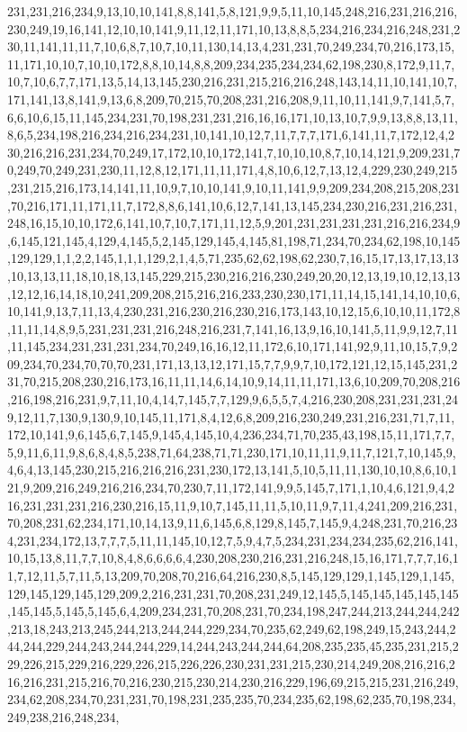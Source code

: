 231,231,216,234,9,13,10,10,141,8,8,141,5,8,121,9,9,5,11,10,145,248,216,231,216,216,230,249,19,16,141,12,10,10,141,9,11,12,11,171,10,13,8,8,5,234,216,234,216,248,231,230,11,141,11,11,7,10,6,8,7,10,7,10,11,130,14,13,4,231,231,70,249,234,70,216,173,15,11,171,10,10,7,10,10,172,8,8,10,14,8,8,209,234,235,234,234,62,198,230,8,172,9,11,7,10,7,10,6,7,7,171,13,5,14,13,145,230,216,231,215,216,216,248,143,14,11,10,141,10,7,171,141,13,8,141,9,13,6,8,209,70,215,70,208,231,216,208,9,11,10,11,141,9,7,141,5,7,6,6,10,6,15,11,145,234,231,70,198,231,231,216,16,16,171,10,13,10,7,9,9,13,8,8,13,11,8,6,5,234,198,216,234,216,234,231,10,141,10,12,7,11,7,7,7,171,6,141,11,7,172,12,4,230,216,216,231,234,70,249,17,172,10,10,172,141,7,10,10,10,8,7,10,14,121,9,209,231,70,249,70,249,231,230,11,12,8,12,171,11,11,171,4,8,10,6,12,7,13,12,4,229,230,249,215,231,215,216,173,14,141,11,10,9,7,10,10,141,9,10,11,141,9,9,209,234,208,215,208,231,70,216,171,11,171,11,7,172,8,8,6,141,10,6,12,7,141,13,145,234,230,216,231,216,231,248,16,15,10,10,172,6,141,10,7,10,7,171,11,12,5,9,201,231,231,231,231,216,216,234,9,6,145,121,145,4,129,4,145,5,2,145,129,145,4,145,81,198,71,234,70,234,62,198,10,145,129,129,1,1,2,2,145,1,1,1,129,2,1,4,5,71,235,62,62,198,62,230,7,16,15,17,13,17,13,13,10,13,13,11,18,10,18,13,145,229,215,230,216,216,230,249,20,20,12,13,19,10,12,13,13,12,12,16,14,18,10,241,209,208,215,216,216,233,230,230,171,11,14,15,141,14,10,10,6,10,141,9,13,7,11,13,4,230,231,216,230,216,230,216,173,143,10,12,15,6,10,10,11,172,8,11,11,14,8,9,5,231,231,231,216,248,216,231,7,141,16,13,9,16,10,141,5,11,9,9,12,7,11,11,145,234,231,231,231,234,70,249,16,16,12,11,172,6,10,171,141,92,9,11,10,15,7,9,209,234,70,234,70,70,70,231,171,13,13,12,171,15,7,7,9,9,7,10,172,121,12,15,145,231,231,70,215,208,230,216,173,16,11,11,14,6,14,10,9,14,11,11,171,13,6,10,209,70,208,216,216,198,216,231,9,7,11,10,4,14,7,145,7,7,129,9,6,5,5,7,4,216,230,208,231,231,231,249,12,11,7,130,9,130,9,10,145,11,171,8,4,12,6,8,209,216,230,249,231,216,231,71,7,11,172,10,141,9,6,145,6,7,145,9,145,4,145,10,4,236,234,71,70,235,43,198,15,11,171,7,7,5,9,11,6,11,9,8,6,8,4,8,5,238,71,64,238,71,71,230,171,10,11,11,9,11,7,121,7,10,145,9,4,6,4,13,145,230,215,216,216,216,231,230,172,13,141,5,10,5,11,11,130,10,10,8,6,10,121,9,209,216,249,216,216,234,70,230,7,11,172,141,9,9,5,145,7,171,1,10,4,6,121,9,4,216,231,231,231,216,230,216,15,11,9,10,7,145,11,11,5,10,11,9,7,11,4,241,209,216,231,70,208,231,62,234,171,10,14,13,9,11,6,145,6,8,129,8,145,7,145,9,4,248,231,70,216,234,231,234,172,13,7,7,7,5,11,11,145,10,12,7,5,9,4,7,5,234,231,234,234,235,62,216,141,10,15,13,8,11,7,7,10,8,4,8,6,6,6,6,4,230,208,230,216,231,216,248,15,16,171,7,7,7,16,11,7,12,11,5,7,11,5,13,209,70,208,70,216,64,216,230,8,5,145,129,129,1,145,129,1,145,129,145,129,145,129,209,2,216,231,231,70,208,231,249,12,145,5,145,145,145,145,145,145,145,5,145,5,145,6,4,209,234,231,70,208,231,70,234,198,247,244,213,244,244,242,213,18,243,213,245,244,213,244,244,229,234,70,235,62,249,62,198,249,15,243,244,244,244,229,244,243,244,244,229,14,244,243,244,244,64,208,235,235,45,235,231,215,229,226,215,229,216,229,226,215,226,226,230,231,231,215,230,214,249,208,216,216,216,216,231,215,216,70,216,230,215,230,214,230,216,229,196,69,215,215,231,216,249,234,62,208,234,70,231,231,70,198,231,235,235,70,234,235,62,198,62,235,70,198,234,249,238,216,248,234,
